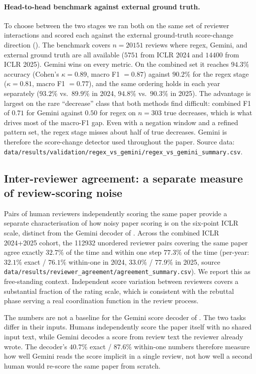 \documentclass{article}
\newcommand{\code}[1]{\texttt{#1}}
\begin{document}
\paragraph{Head-to-head benchmark against external ground truth.}
To choose between the two stages we ran both on the same set of reviewer interactions and scored each against the external ground-truth score-change direction (). The benchmark covers $n = \num{20151}$ reviews where regex, Gemini, and external ground truth are all available ($\num{5751}$ from ICLR 2024 and $\num{14400}$ from ICLR 2025). Gemini wins on every metric. On the combined set it reaches $94.3\%$ accuracy (Cohen's $\kappa = 0.89$, macro F1 $= 0.87$) against $90.2\%$ for the regex stage ($\kappa = 0.81$, macro F1 $= 0.77$), and the same ordering holds in each year separately ($93.2\%$ vs.\ $89.9\%$ in 2024, $94.8\%$ vs.\ $90.3\%$ in 2025). The advantage is largest on the rare ``decrease'' class that both methods find difficult: combined F1 of $0.71$ for Gemini against $0.50$ for regex on $n = 303$ true decreases, which is what drives most of the macro-F1 gap. Even with a negation window and a refined pattern set, the regex stage misses about half of true decreases. Gemini is therefore the score-change detector used throughout the paper. Source data: \code{data/results/validation/regex\_vs\_gemini/regex\_vs\_gemini\_summary.csv}.

\subsection{Inter-reviewer agreement: a separate measure of review-scoring noise}\label{app:reviewer-agree}

Pairs of human reviewers independently scoring the same paper provide a separate characterisation of how noisy paper scoring is on the six-point ICLR scale, distinct from the Gemini decoder of . Across the combined ICLR 2024+2025 cohort, the \num{112932} unordered reviewer pairs covering the same paper agree exactly $32.7\%$ of the time and within one step $77.3\%$ of the time (per-year: $32.1\%$ exact / $76.1\%$ within-one in 2024, $33.0\%$ / $77.9\%$ in 2025, source \code{data/results/reviewer\_agreement/agreement\_summary.csv}). We report this as free-standing context. Independent score variation between reviewers covers a substantial fraction of the rating scale, which is consistent with the rebuttal phase serving a real coordination function in the review process.

The numbers are not a baseline for the Gemini score decoder of . The two tasks differ in their inputs. Humans independently score the paper itself with no shared input text, while Gemini decodes a score from review text the reviewer already wrote. The decoder's $40.7\%$ exact / $87.6\%$ within-one numbers therefore measure how well Gemini reads the score implicit in a single review, not how well a second human would re-score the same paper from scratch.
\end{document}
